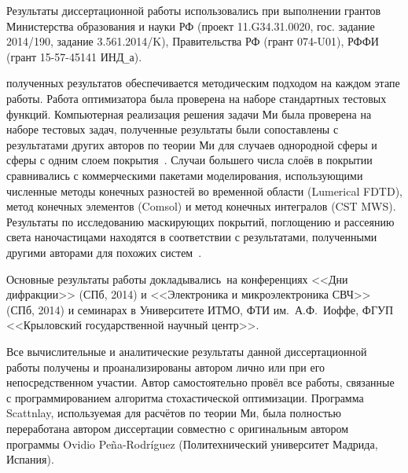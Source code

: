 Результаты диссертационной работы использовались при выполнении
грантов Министерства образования и науки РФ
(проект 11.G34.31.0020, гос. задание 2014/190, задание 3.561.2014/K),
Правительства РФ (грант 074-U01), РФФИ (грант 15-57-45141 ИНД\verb+_+а).


{\reliability} полученных результатов обеспечивается методическим
подходом на каждом этапе работы. Работа оптимизатора была проверена на
наборе стандартных тестовых функций. Компьютерная реализация решения
задачи Ми была проверена на наборе тестовых задач, полученные
результаты были сопоставлены с результатами других авторов по теории
Ми для случаев однородной сферы и сферы с одним слоем
покрытия~\cite{Suzuki-2013, Bashevoy-2005}.  Случаи большего числа
слоёв в покрытии сравнивались с коммерческими пакетами моделирования,
использующими численные методы конечных разностей во временной области
(Lumerical FDTD), метод конечных элементов (Comsol) и метод конечных
интегралов (CST MWS). Результаты по исследованию маскирующих покрытий,
поглощению и рассеянию света наночастицами находятся в соответствии с
результатами, полученными другими авторами для похожих
систем~\cite{Semouchkina-2013, Alu-2014, Fan-2011}.

{\probation}
Основные результаты работы докладывались~на конференциях <<Дни
дифракции>> (СПб, 2014) и <<Электроника и микроэлектроника СВЧ>> (СПб,
2014) и семинарах в Университете ИТМО, ФТИ им.~А.Ф.~Иоффе, ФГУП
<<Крыловский государственной научный центр>>.

{\contribution} Все вычислительные и аналитические результаты данной
диссертационной работы получены и проанализированы автором лично или
при его непосредственном участии.  Автор самостоятельно провёл все
работы, связанные с программированием алгоритма стохастической
оптимизации.  Программа Scattnlay, используемая для расчётов по теории
Ми, была полностью переработана автором диссертации совместно с
оригинальным автором программы Ovidio Pe\~{n}a-Rodr\'{i}guez
(Политехнический университет Мадрида, Испания).

 
